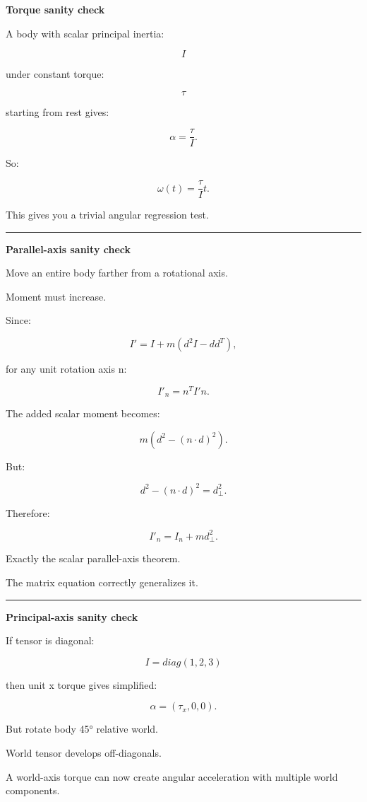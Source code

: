 \textbf{Torque sanity check}

A body with scalar principal inertia:

\[
I
\]

under constant torque:

\[
\tau
\]

starting from rest gives:

\[
\alpha=
\frac{\tau}{I}.
\]

So:

\[
\omega(t)
=
\frac{\tau}{I}t.
\]

This gives you a trivial angular regression test.

\begin{center}\rule{0.5\linewidth}{0.5pt}\end{center}

\textbf{Parallel-axis sanity check}

Move an entire body farther from a rotational axis.

Moment must increase.

Since:

\[
I'
=
I+
m(d^2I-dd^T),
\]

for any unit rotation axis n:

\[
I'_n
=
n^TI'n.
\]

The added scalar moment becomes:

\[
m(
d^2-
(n\cdot d)^2
).
\]

But:

\[
d^2-(n\cdot d)^2
=
d_\perp^2.
\]

Therefore:

\[
\boxed{
I'_n
=
I_n+
md_\perp^2.
}
\]

Exactly the scalar parallel-axis theorem.

The matrix equation correctly generalizes it.

\begin{center}\rule{0.5\linewidth}{0.5pt}\end{center}

\textbf{Principal-axis sanity check}

If tensor is diagonal:

\[
I=
diag(1,2,3)
\]

then unit x torque gives simplified:

\[
\alpha=(\tau_x,0,0).
\]

But rotate body 45° relative world.

World tensor develops off-diagonals.

A world-axis torque can now create angular acceleration with multiple world components.

